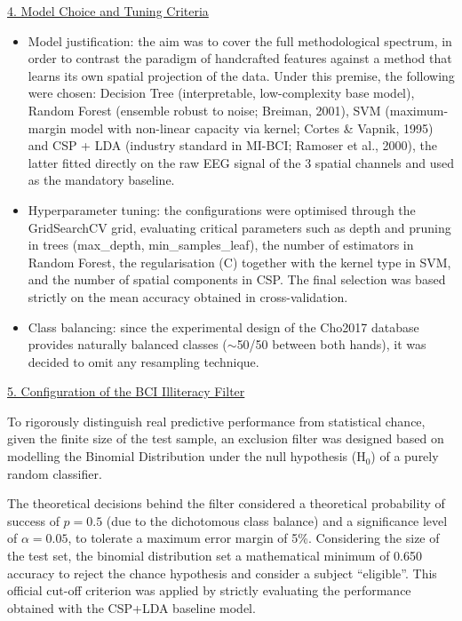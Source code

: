 \documentclass[12pt,a4paper]{article}
\newcommand{\subheading}[1]{%
  \par\noindent\underline{#1}\par\nopagebreak}
\begin{document}
\subheading{4. Model Choice and Tuning Criteria}
\begin{itemize}[label=-, leftmargin=1.3cm]
  \item Model justification: the aim was to cover the full methodological spectrum, in order to
        contrast the paradigm of handcrafted features against a method that learns its own spatial
        projection of the data. Under this premise, the following were chosen: Decision Tree
        (interpretable, low-complexity base model), Random Forest (ensemble robust to noise;
        Breiman, 2001), SVM (maximum-margin model with non-linear capacity via kernel; Cortes \&
        Vapnik, 1995) and CSP + LDA (industry standard in MI-BCI; Ramoser et al., 2000), the
        latter fitted directly on the raw EEG signal of the 3 spatial channels and used as the
        mandatory baseline.
  \item Hyperparameter tuning: the configurations were optimised through the GridSearchCV grid,
        evaluating critical parameters such as depth and pruning in trees (max\_depth,
        min\_samples\_leaf), the number of estimators in Random Forest, the regularisation (C)
        together with the kernel type in SVM, and the number of spatial components in CSP. The
        final selection was based strictly on the mean accuracy obtained in cross-validation.
  \item Class balancing: since the experimental design of the Cho2017 database provides naturally
        balanced classes ($\sim$50/50 between both hands), it was decided to omit any resampling
        technique.
\end{itemize}

\subheading{5. Configuration of the BCI Illiteracy Filter}
To rigorously distinguish real predictive performance from statistical chance, given the finite
size of the test sample, an exclusion filter was designed based on modelling the Binomial
Distribution under the null hypothesis (H$_0$) of a purely random classifier.

The theoretical decisions behind the filter considered a theoretical probability of success of
$p = 0.5$ (due to the dichotomous class balance) and a significance level of $\alpha = 0.05$, to
tolerate a maximum error margin of 5\%. Considering the size of the test set, the binomial
distribution set a mathematical minimum of 0.650 accuracy to reject the chance hypothesis and
consider a subject ``eligible''. This official cut-off criterion was applied by strictly
evaluating the performance obtained with the CSP+LDA baseline model.
\end{document}
